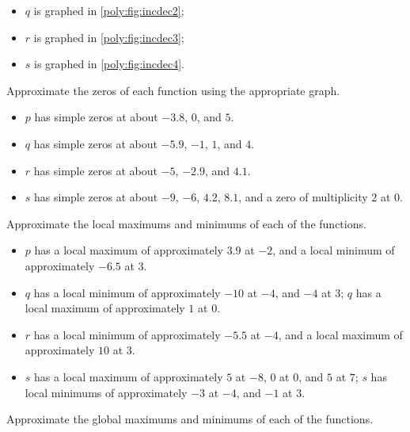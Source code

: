 \begin{exercises}
\begin{problem}
\begin{subproblem}
\begin{shortsolution}
\begin{itemize}
			\item $q$ is graphed in \vref{poly:fig:incdec2};
			\item $r$ is graphed in \vref{poly:fig:incdec3};
			\item $s$ is graphed in \vref{poly:fig:incdec4}.
		\end{itemize}
	\end{shortsolution}
\end{subproblem}
\begin{subproblem}
	Approximate the zeros of each function using the appropriate graph.
	\begin{shortsolution}
		\begin{itemize}
			\item $p$ has simple zeros at about $-3.8$, $0$, and $5$.
			\item $q$ has simple zeros at about $-5.9$, $-1$, $1$, and $4$.
			\item $r$ has simple zeros at about $-5$, $-2.9$, and $4.1$.
			\item $s$ has simple zeros at about $-9$, $-6$, $4.2$, $8.1$, and a zero of multiplicity $2$ at $0$.
		\end{itemize}
	\end{shortsolution}
\end{subproblem}
\begin{subproblem}
	Approximate the local maximums and minimums of each of the functions.
	\begin{shortsolution}
		\begin{itemize}
			\item $p$ has a local maximum of approximately $3.9$ at $-2$, and a local minimum of approximately $-6.5$ at $3$.
			\item $q$ has a local minimum of approximately $-10$ at $-4$, and $-4$ at $3$; $q$ has a local maximum of approximately $1$ at $0$.
			\item $r$ has a local minimum of approximately $-5.5$ at $-4$, and a local maximum of approximately $10$ at $3$.
			\item $s$ has a local maximum of approximately $5$ at $-8$, $0$ at $0$, and $5$ at  $7$; $s$ has local minimums 
			of approximately $-3$ at $-4$, and $-1$ at $3$.
		\end{itemize}
	\end{shortsolution}
\end{subproblem}
\begin{subproblem}
	Approximate the global maximums and minimums of each of the functions.
	\begin{shortsolution}

\end{shortsolution}
\end{subproblem}
\end{problem}
\end{exercises}
